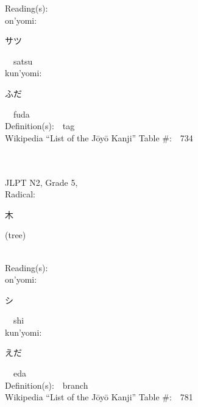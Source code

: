 \begin{multicols}{2}
Reading(s):\ \ \\
{\hspace*{1em}}on'yomi:\ \ \\
{\hspace*{2em}}{\begin{CJK}{UTF8}{min} サツ \end{CJK}}\ \ satsu\ \ \\
{\hspace*{1em}}kun'yomi:\ \ \\
{\hspace*{2em}}{\begin{CJK}{UTF8}{min} ふだ \end{CJK}}\ \ fuda\ \ \\
Definition(s):\ \ tag \\
Wikipedia ``List of the J\=oy\=o Kanji'' Table \#:\ \ 734 \\
\ \ \\
{\fontsize{34pt}{40pt}  }\ \ \\  %
{JLPT N2, Grade 5, \\Radical:\ \ {\begin{CJK}{UTF8}{min} 木 \end{CJK}} (tree) } \\
Reading(s):\ \ \\
{\hspace*{1em}}on'yomi:\ \ \\
{\hspace*{2em}}{\begin{CJK}{UTF8}{min} シ \end{CJK}}\ \ shi\ \ \\
{\hspace*{1em}}kun'yomi:\ \ \\
{\hspace*{2em}}{\begin{CJK}{UTF8}{min} えだ \end{CJK}}\ \ eda\ \ \\
Definition(s):\ \ branch \\
Wikipedia ``List of the J\=oy\=o Kanji'' Table \#:\ \ 781 \\
\ \ \\
{\fontsize{34pt}{40pt}  }\ \ \\  %

\end{multicols}
